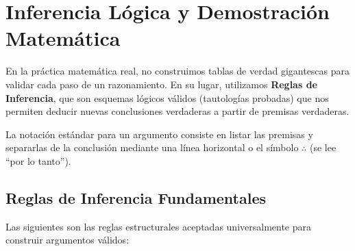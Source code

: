 \section{Inferencia Lógica y Demostración Matemática}

En la práctica matemática real, no construimos tablas de verdad gigantescas para validar cada paso de un razonamiento. En su lugar, utilizamos \textbf{Reglas de Inferencia}, que son esquemas lógicos válidos (tautologías probadas) que nos permiten deducir nuevas conclusiones verdaderas a partir de premisas verdaderas.

La notación estándar para un argumento consiste en listar las premisas y separarlas de la conclusión mediante una línea horizontal o el símbolo $\therefore$ (se lee ``por lo tanto'').

\subsection{Reglas de Inferencia Fundamentales}

Las siguientes son las reglas estructurales aceptadas universalmente para construir argumentos válidos:

